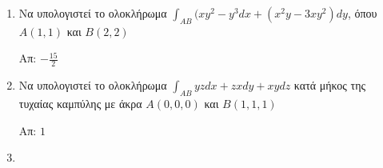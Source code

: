 



\everymath{\displaystyle}
\thispagestyle{empty}




\begin{center}
\end{center}


\vspace{\baselineskip}


\begin{enumerate}
    \item Να υπολογιστεί το ολοκλήρωμα $ \int_{AB} (xy^{2}-y^{3}dx+(x^{2}y-3xy^{2})dy $, \quad όπου $ A(1,1) $ και $ B(2,2) $
        
        \hfill Απ:  $ - \frac{15}{2} $

    \item Να υπολογιστεί το ολοκλήρωμα $ \int_{AB} yzdx + zxdy + xydz  $ κατά μήκος της τυχαίας
        καμπύλης με άκρα $ A(0,0,0) $ και $ B(1,1,1) $

        \hfill Απ: $ 1 $ 

    \item 

\end{enumerate}







